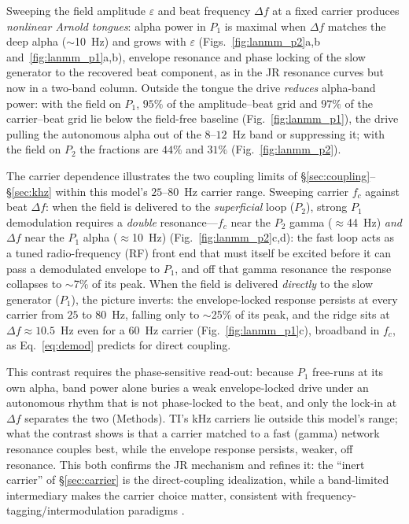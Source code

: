 \documentclass[11pt,a4paper]{article}
\begin{document}
Sweeping the field amplitude $\varepsilon$ and beat frequency $\Delta f$ at a fixed
carrier produces \emph{nonlinear Arnold tongues}: alpha power in $P_1$ is maximal
when $\Delta f$ matches the deep alpha ($\sim$10~Hz) and grows with $\varepsilon$
(Figs.~\ref{fig:lanmm_p2}a,b and~\ref{fig:lanmm_p1}a,b), envelope resonance and
phase locking of the slow generator to the recovered beat component, as in the
JR resonance curves but now in a two-band column. Outside the tongue the drive
\emph{reduces} alpha-band power: with the field on $P_1$, $95\%$ of the amplitude--beat
grid and $97\%$ of the carrier--beat grid lie below the field-free baseline
(Fig.~\ref{fig:lanmm_p1}), the drive pulling the autonomous alpha out of the $8$--$12$~Hz
band or suppressing it; with the field on $P_2$ the fractions are $44\%$ and $31\%$
(Fig.~\ref{fig:lanmm_p2}).

The carrier dependence illustrates the two coupling
limits of \S\ref{sec:coupling}--\S\ref{sec:khz} within this model's $25$--$80$~Hz carrier
range. Sweeping carrier $f_c$ against
beat $\Delta f$: when the field is delivered to the \emph{superficial} loop
($P_2$), strong $P_1$ demodulation requires a \emph{double} resonance---$f_c$ near
the $P_2$ gamma ($\approx$44~Hz) \emph{and} $\Delta f$ near the $P_1$ alpha
($\approx$10~Hz) (Fig.~\ref{fig:lanmm_p2}c,d): the fast loop acts as a tuned
radio-frequency (RF) front end that must itself be excited before it can pass a demodulated
envelope to $P_1$, and off that gamma resonance the response collapses to
$\sim$7\% of its peak. When the field is delivered \emph{directly} to the slow
generator ($P_1$), the picture inverts: the envelope-locked response persists at
every carrier from $25$ to $80$~Hz, falling only to $\sim$25\% of its peak, and the
ridge sits at $\Delta f\!\approx\!10.5$~Hz even for a $60$~Hz carrier
(Fig.~\ref{fig:lanmm_p1}c), broadband in $f_c$, as Eq.~\eqref{eq:demod} predicts for
direct coupling.

This contrast requires the phase-sensitive read-out: because $P_1$
free-runs at its own alpha, band power alone buries a weak envelope-locked drive under
an autonomous rhythm that is not phase-locked to the beat, and only the lock-in at
$\Delta f$ separates the two (Methods). TI's kHz carriers lie outside this model's range; what the contrast shows is that a
carrier matched to a fast (gamma) network resonance couples best, while the envelope
response persists, weaker, off resonance. This both confirms the JR mechanism
and refines it: the ``inert carrier'' of \S\ref{sec:carrier} is the
direct-coupling idealization, while a band-limited intermediary makes the carrier
choice matter, consistent with frequency-tagging/intermodulation paradigms
\cite{gordon2019}.
\end{document}
